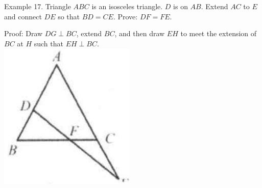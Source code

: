 \documentclass[10pt]{article}
\begin{document}
Example 17. Triangle \(A B C\) is an isosceles triangle. \(D\) is on \(A B\). Extend \(A C\) to \(E\) and connect \(D E\) so that \(B D=C E\). Prove: \(D F=F E\).

Proof:
Draw \(D G \perp B C\), extend \(B C\), and then draw \(E H\) to meet the extension of \(B C\) at \(H\) such that \(E H \perp B C\).\\
\includegraphics[max width=\textwidth, center]{2025_04_17_97bc1f7e44d93c271a88g-084(3)}
\end{document}
